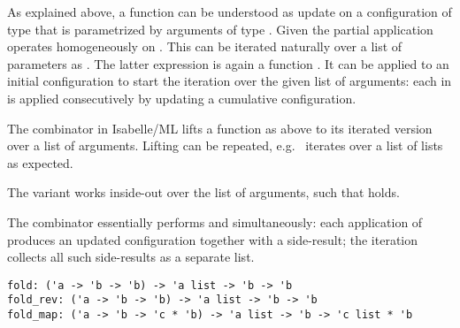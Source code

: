 \begin{isabellebody}
\begin{isamarkuptext}
\end{isamarkuptext}%
\isamarkuptrue%
%
\endisatagmlref
{\isafoldmlref}%
%
\isadelimmlref
%
\endisadelimmlref
%
\isamarkuptrue%
%
\begin{isamarkuptext}%
As explained above, a function  can be
  understood as update on a configuration of type \isa{{\isasymbeta}} that is
  parametrized by arguments of type \isa{{\isasymalpha}}.  Given 
  the partial application  operates
  homogeneously on \isa{{\isasymbeta}}.  This can be iterated naturally over a
  list of parameters  as .  The latter expression is again a function \isa{{\isasymbeta}\ {\isasymrightarrow}\ {\isasymbeta}}.
  It can be applied to an initial configuration  to
  start the iteration over the given list of arguments: each  in  is applied consecutively by updating a
  cumulative configuration.

  The  combinator in Isabelle/ML lifts a function  as above to its iterated version over a list of arguments.
  Lifting can be repeated, e.g.\  iterates
  over a list of lists as expected.

  The variant  works inside-out over the list of
  arguments, such that  holds.

  The  combinator essentially performs  and  simultaneously: each application of  produces an updated configuration together with a side-result;
  the iteration collects all such side-results as a separate list.%
\end{isamarkuptext}%
\isamarkuptrue%
%
\isadelimmlref
%
\endisadelimmlref
%
\isatagmlref
%
\begin{isamarkuptext}%
\begin{mldecls}
  \verb|fold: ('a -> 'b -> 'b) -> 'a list -> 'b -> 'b| \\
  \verb|fold_rev: ('a -> 'b -> 'b) -> 'a list -> 'b -> 'b| \\
  \verb|fold_map: ('a -> 'b -> 'c * 'b) -> 'a list -> 'b -> 'c list * 'b| \\
  \end{mldecls}


\end{isamarkuptext}
\end{isabellebody}
